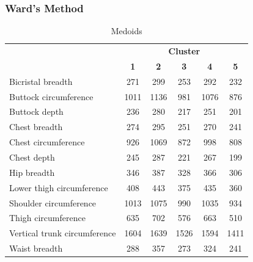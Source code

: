 \documentclass[12pt,a4paper,openany,UKenglish]{scrreprt}
\begin{document}
\subsubsection{Ward's Method}
\begin{table}[H]
	\footnotesize
	\centering
	\caption{Medoids}
	\begin{tabular}{lccccc}
		\cline{2-6}
		                             & \multicolumn{5}{c}{\textbf{Cluster}}                                                     \\
		                             & \textbf{1}                           & \textbf{2} & \textbf{3} & \textbf{4} & \textbf{5} \\
		\hline\hline
		Bicristal breadth            & 271                                  & 299        & 253        & 292        & 232        \\
		Buttock circumference        & 1011                                 & 1136       & 981        & 1076       & 876        \\
		Buttock depth                & 236                                  & 280        & 217        & 251        & 201        \\
		Chest breadth                & 274                                  & 295        & 251        & 270        & 241        \\
		Chest circumference          & 926                                  & 1069       & 872        & 998        & 808        \\
		Chest depth                  & 245                                  & 287        & 221        & 267        & 199        \\
		Hip breadth                  & 346                                  & 387        & 328        & 366        & 306        \\
		Lower thigh circumference    & 408                                  & 443        & 375        & 435        & 360        \\
		Shoulder circumference       & 1013                                 & 1075       & 990        & 1035       & 934        \\
		Thigh circumference          & 635                                  & 702        & 576        & 663        & 510        \\
		Vertical trunk circumference & 1604                                 & 1639       & 1526       & 1594       & 1411       \\
		Waist breadth                & 288                                  & 357        & 273        & 324        & 241        \\

\end{tabular}
\end{table}
\end{document}
